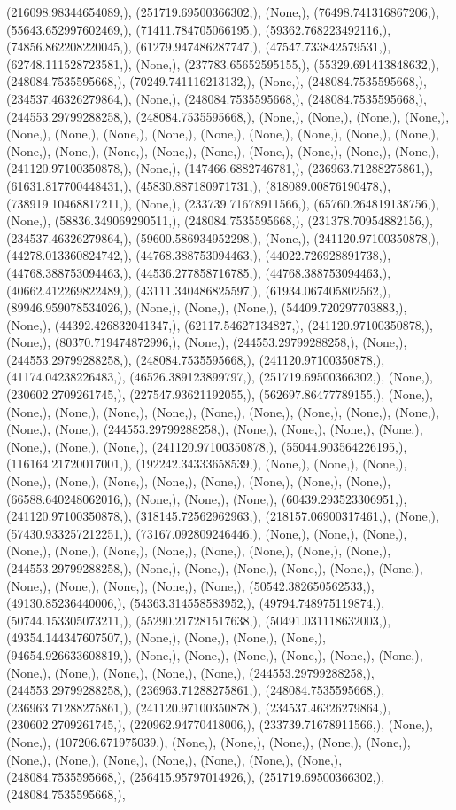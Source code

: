 \documentclass{article}
\begin{document}
(216098.98344654089,), (251719.69500366302,), (None,), (76498.741316867206,), (55643.652997602469,), (71411.784705066195,), (59362.768223492116,), (74856.862208220045,), (61279.947486287747,), (47547.733842579531,), (62748.111528723581,), (None,), (237783.65652595155,), (55329.691413848632,), (248084.7535595668,), (70249.741116213132,), (None,), (248084.7535595668,), (234537.46326279864,), (None,), (248084.7535595668,), (248084.7535595668,), (244553.29799288258,), (248084.7535595668,), (None,), (None,), (None,), (None,), (None,), (None,), (None,), (None,), (None,), (None,), (None,), (None,), (None,), (None,), (None,), (None,), (None,), (None,), (None,), (None,), (None,), (None,), (241120.97100350878,), (None,), (147466.6882746781,), (236963.71288275861,), (61631.817700448431,), (45830.887180971731,), (818089.00876190478,), (738919.10468817211,), (None,), (233739.71678911566,), (65760.264819138756,), (None,), (58836.349069290511,), (248084.7535595668,), (231378.70954882156,), (234537.46326279864,), (59600.586934952298,), (None,), (241120.97100350878,), (44278.013360824742,), (44768.388753094463,), (44022.726928891738,), (44768.388753094463,), (44536.277858716785,), (44768.388753094463,), (40662.412269822489,), (43111.340486825597,), (61934.067405802562,), (89946.959078534026,), (None,), (None,), (None,), (54409.720297703883,), (None,), (44392.426832041347,), (62117.54627134827,), (241120.97100350878,), (None,), (80370.719474872996,), (None,), (244553.29799288258,), (None,), (244553.29799288258,), (248084.7535595668,), (241120.97100350878,), (41174.04238226483,), (46526.389123899797,), (251719.69500366302,), (None,), (230602.2709261745,), (227547.93621192055,), (562697.86477789155,), (None,), (None,), (None,), (None,), (None,), (None,), (None,), (None,), (None,), (None,), (None,), (None,), (244553.29799288258,), (None,), (None,), (None,), (None,), (None,), (None,), (None,), (241120.97100350878,), (55044.903564226195,), (116164.21720017001,), (192242.34333658539,), (None,), (None,), (None,), (None,), (None,), (None,), (None,), (None,), (None,), (None,), (None,), (66588.640248062016,), (None,), (None,), (None,), (60439.293523306951,), (241120.97100350878,), (318145.72562962963,), (218157.06900317461,), (None,), (57430.933257212251,), (73167.092809246446,), (None,), (None,), (None,), (None,), (None,), (None,), (None,), (None,), (None,), (None,), (None,), (244553.29799288258,), (None,), (None,), (None,), (None,), (None,), (None,), (None,), (None,), (None,), (None,), (None,), (50542.382650562533,), (49130.85236440006,), (54363.314558583952,), (49794.748975119874,), (50744.153305073211,), (55290.217281517638,), (50491.031118632003,), (49354.144347607507,), (None,), (None,), (None,), (None,), (94654.926633608819,), (None,), (None,), (None,), (None,), (None,), (None,), (None,), (None,), (None,), (None,), (None,), (244553.29799288258,), (244553.29799288258,), (236963.71288275861,), (248084.7535595668,), (236963.71288275861,), (241120.97100350878,), (234537.46326279864,), (230602.2709261745,), (220962.94770418006,), (233739.71678911566,), (None,), (None,), (107206.671975039,), (None,), (None,), (None,), (None,), (None,), (None,), (None,), (None,), (None,), (None,), (None,), (None,), (248084.7535595668,), (256415.95797014926,), (251719.69500366302,), (248084.7535595668,), 
\end{document}
